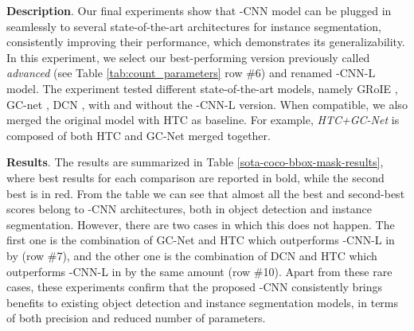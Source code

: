 \documentclass[runningheads, orivec]{llncs}
\begin{document}
\noindent\textbf{Description}.
Our final experiments show that -CNN model can be plugged in seamlessly to several state-of-the-art architectures for instance segmentation, consistently improving their performance, which demonstrates its generalizability.
In this experiment, we select our best-performing version previously called \textit{advanced} (see Table \ref{tab:count_parameters} row \#6) and renamed -CNN-L model.
The experiment tested different state-of-the-art models, namely GRoIE \cite{rossi2020novel}, GC-net \cite{cao2019gcnet}, DCN \cite{zhu2019deformable}, with and without the -CNN-L version.
When compatible, we also merged the original model with HTC as baseline.
For example, \emph{HTC+GC-Net} is composed of both HTC and GC-Net merged together.

\noindent\textbf{Results}.
The results are summarized in Table \ref{sota-coco-bbox-mask-results}, where best results for each comparison are reported in bold, while the second best is in red.
From the table we can see that almost all the best and second-best scores belong to -CNN architectures, both in object detection and instance segmentation.
However, there are two cases in which this does not happen. 
The first one is the combination of GC-Net and HTC which outperforms -CNN-L in  by  (row \#7), and the other one is the combination of DCN and HTC which outperforms -CNN-L in  by the same amount (row \#10). 
Apart from these rare cases, these experiments confirm that the proposed -CNN consistently brings benefits to existing object detection and instance segmentation models, in terms of both precision and reduced number of parameters.
\end{document}
